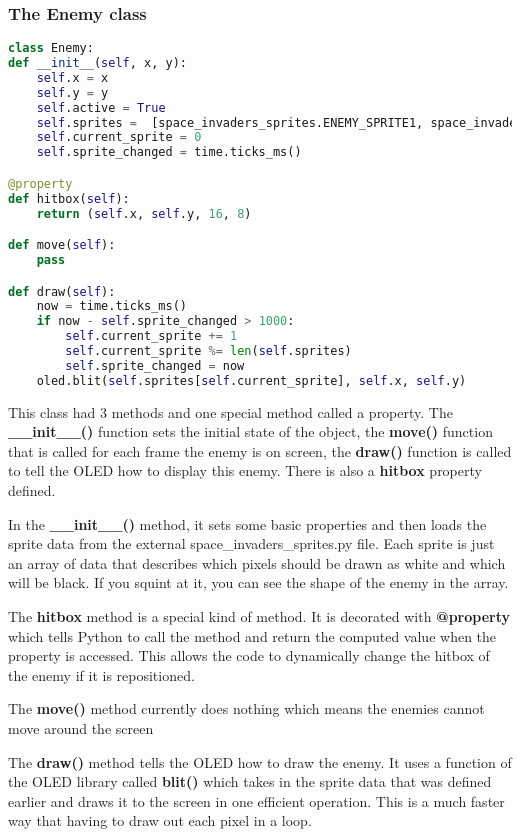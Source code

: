 \subsubsection{The Enemy class}
\begin{lstlisting}[language=Python,caption=The Enemy class]
class Enemy:
def __init__(self, x, y):
    self.x = x
    self.y = y
    self.active = True
    self.sprites =  [space_invaders_sprites.ENEMY_SPRITE1, space_invaders_sprites.ENEMY_SPRITE2]
    self.current_sprite = 0
    self.sprite_changed = time.ticks_ms()

@property
def hitbox(self):
    return (self.x, self.y, 16, 8)

def move(self):
    pass

def draw(self):
    now = time.ticks_ms()
    if now - self.sprite_changed > 1000:
        self.current_sprite += 1
        self.current_sprite %= len(self.sprites)
        self.sprite_changed = now
    oled.blit(self.sprites[self.current_sprite], self.x, self.y)
\end{lstlisting}

This class had 3 methods and one special method called a property. The \textbf{\_\_init\_\_()} function sets the
initial state of the object, the \textbf{move()} function that is called for each frame the enemy is on screen,
the \textbf{draw()} function is called to tell the OLED how to display this enemy. There is also a \textbf{hitbox}
property defined.

In the \textbf{\_\_init\_\_()} method, it sets some basic properties and then loads the sprite data from the external
space\_invaders\_sprites.py file. Each sprite is just an array of data that describes which pixels should be drawn
as white and which will be black. If you squint at it, you can see the shape of the enemy in the array.

The \textbf{hitbox} method is a special kind of method. It is decorated with \textbf{@property} which tells Python
to call the method and return the computed value when the property is accessed. This allows the code to dynamically
change the hitbox of the enemy if it is repositioned.

The \textbf{move()} method currently does nothing which means the enemies cannot move around the screen

The \textbf{draw()} method tells the OLED how to draw the enemy. It uses a function of the OLED library called \textbf{blit()}
which takes in the sprite data that was defined earlier and draws it to the screen in one efficient operation. This is a
much faster way that having to draw out each pixel in a loop.

